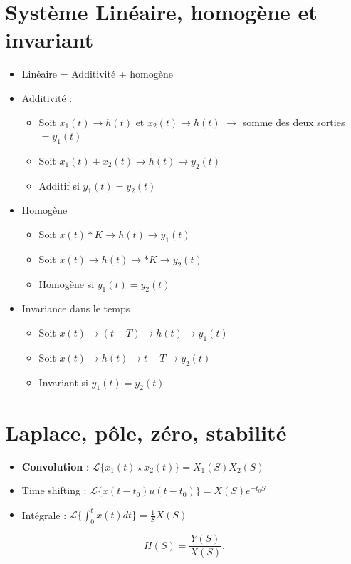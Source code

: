 \documentclass{article}
\theoremstyle{plain}%
\theoremstyle{definition}
\theoremstyle{remark}
\begin{document}
\section{Système Linéaire, homogène et invariant}
\begin{itemize}
    \item Linéaire = Additivité + homogène 
    \item Additivité : \begin{itemize}
        \item Soit $ x_1(t) \to h(t) $ et $ x_2(t) \to h(t) $ $\rightarrow$ somme des deux sorties $ = y_1(t) $
        \item Soit $ x_1(t)+x_2(t) \to h(t) \to y_2(t) $
        \item Additif si $ y_1(t) = y_2(t) $  
    \end{itemize} 
    \item Homogène \begin{itemize}
        \item Soit $ x(t)*K \to h(t) \to y_1(t)$ 
        \item Soit $ x(t) \to h(t) \to *K \to y_2(t)$
        \item Homogène si $ y_1(t) = y_2(t) $
    \end{itemize}
    \item Invariance dans le temps \begin{itemize}
        \item Soit $ x(t) \to (t-T) \to h(t) \to y_1(t) $ 
        \item Soit $ x(t) \to h(t) \to t-T \to y_2(t) $ 
        \item Invariant si $ y_1(t) = y_2(t) $
    \end{itemize}
\end{itemize}

\section{Laplace, pôle, zéro, stabilité}
\begin{itemize}
    \item \textbf{Convolution} : $ \mathcal{L}\{x_1(t) \star x_2(t)\} = X_1(S) X_2(S)$ 
    \item Time shifting : $ \mathcal{L}\{x(t-t_0) u(t - t_0)\} = X(S)e^{-t_0 S}$ 
    \item Intégrale : $ \mathcal{L}\{\int_{0}^{t}x(t)dt\} = \frac{1}{S}X(S) $ 
\end{itemize}
\[
    H(S) = \frac{Y(S)}{X(S)}
.\]
\end{document}
